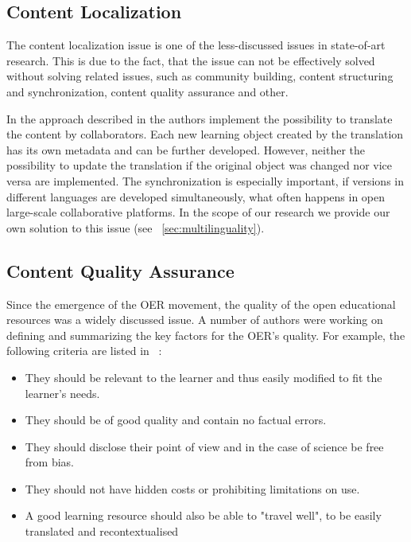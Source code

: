 \documentclass[ngerman,UKenglish,table]{scrbook}
\begin{document}
\subsection{Content Localization}

The content localization issue is one of the less-discussed issues in state-of-art research.
This is due to the fact, that the issue can not be effectively solved without solving related issues, such as community building, content structuring and synchronization, content quality assurance and other.

In the approach described in \cite{Leinonen2010} the authors implement the possibility to translate the content by collaborators.
Each new learning object created by the translation has its own metadata and can be further developed.
However, neither the possibility to update the translation if the original object was changed nor vice versa are implemented.
The synchronization is especially important, if versions in different languages are developed simultaneously, what often happens in open large-scale collaborative platforms.
In the scope of our research we provide our own solution to this issue (see ~\autoref{sec:multilinguality}).

\subsection{Content Quality Assurance}

Since the emergence of the OER movement, the quality of the open educational resources was a widely discussed issue.
A number of authors were working on defining and summarizing the key factors for the OER's quality.
For example, the following criteria are listed in ~\cite{travelwell, Leinonen2010}:
\begin{itemize}
\item They should be relevant to the learner and thus easily modified to fit the learner’s needs.
\item They should be of good quality and contain no factual errors.
\item They should disclose their point of view and in the case of science be free from bias.
\item They should not have hidden costs or prohibiting limitations on use.
\item A good learning resource should also be able to "travel well", to be easily translated and recontextualised
\end{itemize}
\end{document}
